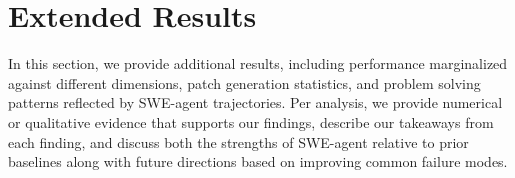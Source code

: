 \section{Extended Results}
\label{appx:results}
In this section, we provide additional results, including performance marginalized against different dimensions, patch generation statistics, and problem solving patterns reflected by SWE-agent trajectories.
Per analysis, we provide numerical or qualitative evidence that supports our findings, describe our takeaways from each finding, and discuss both the strengths of SWE-agent relative to prior baselines along with future directions based on improving common failure modes.









